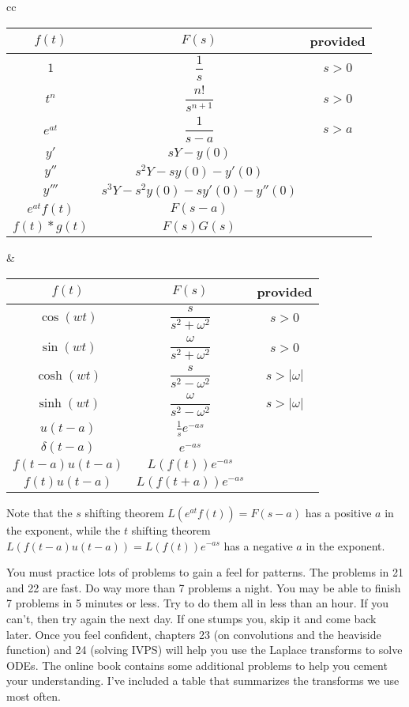 \begin{table}[h]
\begin{center}
\begin{tabular}{cc}
\begin{tabular}[t]{|c|cc|}
\hline
$f(t)$ & $F(s)$ & provided\\
\hline\hline
$1$					&$\dfrac{1}{s}$ 							&$s>0$\\\hline
$t^n$				&$\dfrac{n!}{s^{n+1}}$ 			&$s>0$\\\hline
$e^{at}$		&$\dfrac{1}{s-a}$ 			&$s>a$\\\hline
$y'$					&$sY-y(0)$ 						&\\\hline
$y''$					&$s^2Y-sy(0)-y'(0)$ 						&\\\hline
$y'''$					&$s^3Y-s^2y(0)-sy'(0)-y''(0)$ 						&\\\hline
$e^{at}f(t)$  &$F(s-a)$ 						&\\\hline
$f(t)*g(t)$  &$F(s)G(s)$ 						&\\\hline
\end{tabular}
&
\begin{tabular}[t]{|c|cc|}
\hline
$f(t)$ & $F(s)$ & provided\\
\hline\hline
$\cos(wt)$  &$\dfrac{s}{s^2+\omega^2}$ 			&$s>0$\\\hline
$\sin(wt)$  &$\dfrac{\omega}{s^2+\omega^2}$ 			&$s>0$\\\hline
$\cosh(wt)$ &$\dfrac{s}{s^2-\omega^2}$ 			&$s>|\omega|$\\\hline
$\sinh(wt)$ &$\dfrac{\omega}{s^2-\omega^2}$ 			&$s>|\omega|$\\\hline
$u(t-a)$  &$\frac{1}{s}e^{-as}$ 						&\\\hline
$\delta(t-a)$  &$e^{-as}$ 						&\\\hline
$f(t-a)u(t-a)$  &$L(f(t))e^{-as}$ 						&\\
$f(t)u(t-a)$  &$L(f(t+a))e^{-as}$ 						&\\
\hline
\end{tabular}
\end{tabular}
Note that the $s$ shifting theorem $L(e^{at}f(t))=F(s-a)$ has a positive $a$ in the exponent, while the $t$ shifting theorem $L(f(t-a)u(t-a))=L(f(t))e^{-as}$ has a negative $a$ in the exponent.
\end{center}
\end{table}

You must practice lots of problems to gain a feel for patterns.  The problems in 21 and 22 are fast.  Do way more than 7 problems a night.  You may be able to finish 7 problems in 5 minutes or less. Try to do them all in less than an hour.  If you can't, then try again the next day. If one stumps you, skip it and come back later.  Once you feel confident, chapters 23 (on convolutions and the heaviside function) and 24 (solving IVPS) will help you use the Laplace transforms to solve ODEs. The online book contains some additional problems to help you cement your understanding. I've included a table that summarizes the transforms we use most often.


